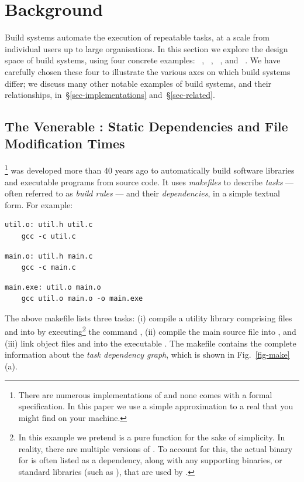 \section{Background}\label{sec-background}

Build systems automate the execution of repeatable tasks, at a scale from individual users
up to large organisations. In this section we explore the design space of build
systems, using four concrete examples: \Make~\cite{feldman1979make},
\Shake~\cite{mitchell2012shake}, \Bazel~\cite{bazel}, and
\Excel~\cite{advanced_excel}.
We have carefully chosen these four to illustrate the various axes on which
build systems differ; we discuss many other notable examples of build systems,
and their relationships, in~\S\ref{sec-implementations} and~\S\ref{sec-related}.

\subsection{The Venerable \Make: Static Dependencies and File Modification Times}
\label{sec-background-make}

\Make\footnote{There are numerous implementations of \Make and none comes with a
formal specification. In this paper we use a simple approximation to a real
\Make that you might find on your machine.} was developed
more than 40 years ago to automatically build software libraries and executable
programs from source code. It uses \emph{makefiles} to describe \emph{tasks} --- often
referred to as \emph{build rules} --- and their \emph{dependencies}, in a simple textual
form. For example:

\vspace{1mm}
\begin{verbatim}
util.o: util.h util.c
    gcc -c util.c
\end{verbatim}
\begin{verbatim}
main.o: util.h main.c
    gcc -c main.c
\end{verbatim}
\begin{verbatim}
main.exe: util.o main.o
    gcc util.o main.o -o main.exe
\end{verbatim}
\vspace{1mm}

\noindent
The above makefile lists three tasks: (i) compile a utility library comprising
files  and  into  by
executing\footnote{In this example we pretend  is a pure function for
  the sake of simplicity. In reality, there are multiple versions of .
  To account for this, the actual binary for  is often listed as a dependency, along
  with any supporting binaries, or standard libraries (such as ),
  that are used by .
} the command
, (ii) compile the main source file  into
, and (iii) link object files  and  into the
executable . The makefile contains the complete information about
the \emph{task dependency graph}, which is shown in Fig.~\ref{fig-make}(a).

